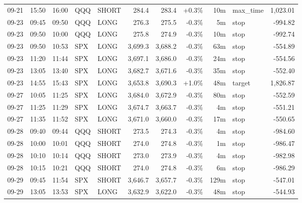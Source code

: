 \documentclass[11pt,a4paper,twoside]{article}
\begin{document}
\begin{center}
\begin{longtable}{>{\color{txtmain}}l l l l l r r r r >{\color{txtmain}}l r}
09-21 & 15:50 & 16:00 & QQQ & SHORT & 284.4 & 283.4 & \textcolor{wingreen}{+0.3\%} & 10m & max\_time & \textcolor{wingreen}{1,023.01} \\
09-23 & 09:45 & 09:50 & QQQ & LONG & 276.3 & 275.5 & \textcolor{lossred}{-0.3\%} & 5m & stop & \textcolor{lossred}{-994.82} \\
09-23 & 09:50 & 10:00 & QQQ & LONG & 275.8 & 274.9 & \textcolor{lossred}{-0.3\%} & 10m & stop & \textcolor{lossred}{-992.74} \\
09-23 & 09:50 & 10:53 & SPX & LONG & 3,699.3 & 3,688.2 & \textcolor{lossred}{-0.3\%} & 63m & stop & \textcolor{lossred}{-554.89} \\
09-23 & 11:20 & 11:44 & SPX & LONG & 3,697.1 & 3,686.0 & \textcolor{lossred}{-0.3\%} & 24m & stop & \textcolor{lossred}{-554.56} \\
09-23 & 13:05 & 13:40 & SPX & LONG & 3,682.7 & 3,671.6 & \textcolor{lossred}{-0.3\%} & 35m & stop & \textcolor{lossred}{-552.40} \\
09-23 & 14:55 & 15:43 & SPX & LONG & 3,653.8 & 3,690.3 & \textcolor{wingreen}{+1.0\%} & 48m & target & \textcolor{wingreen}{1,826.87} \\
09-27 & 10:05 & 11:25 & SPX & LONG & 3,684.0 & 3,672.9 & \textcolor{lossred}{-0.3\%} & 80m & stop & \textcolor{lossred}{-552.59} \\
09-27 & 11:25 & 11:29 & SPX & LONG & 3,674.7 & 3,663.7 & \textcolor{lossred}{-0.3\%} & 4m & stop & \textcolor{lossred}{-551.21} \\
09-27 & 11:35 & 11:52 & SPX & LONG & 3,671.0 & 3,660.0 & \textcolor{lossred}{-0.3\%} & 17m & stop & \textcolor{lossred}{-550.65} \\
09-28 & 09:40 & 09:44 & QQQ & SHORT & 273.5 & 274.3 & \textcolor{lossred}{-0.3\%} & 4m & stop & \textcolor{lossred}{-984.60} \\
09-28 & 10:00 & 10:01 & QQQ & SHORT & 274.0 & 274.8 & \textcolor{lossred}{-0.3\%} & 1m & stop & \textcolor{lossred}{-986.47} \\
09-28 & 10:10 & 10:14 & QQQ & SHORT & 273.0 & 273.9 & \textcolor{lossred}{-0.3\%} & 4m & stop & \textcolor{lossred}{-982.98} \\
09-28 & 10:15 & 10:21 & QQQ & SHORT & 274.0 & 274.8 & \textcolor{lossred}{-0.3\%} & 6m & stop & \textcolor{lossred}{-986.29} \\
09-29 & 09:45 & 11:54 & SPX & SHORT & 3,646.7 & 3,657.7 & \textcolor{lossred}{-0.3\%} & 129m & stop & \textcolor{lossred}{-547.01} \\
09-29 & 13:05 & 13:53 & SPX & LONG & 3,632.9 & 3,622.0 & \textcolor{lossred}{-0.3\%} & 48m & stop & \textcolor{lossred}{-544.93} \\

\end{longtable}
\end{center}
\end{document}
